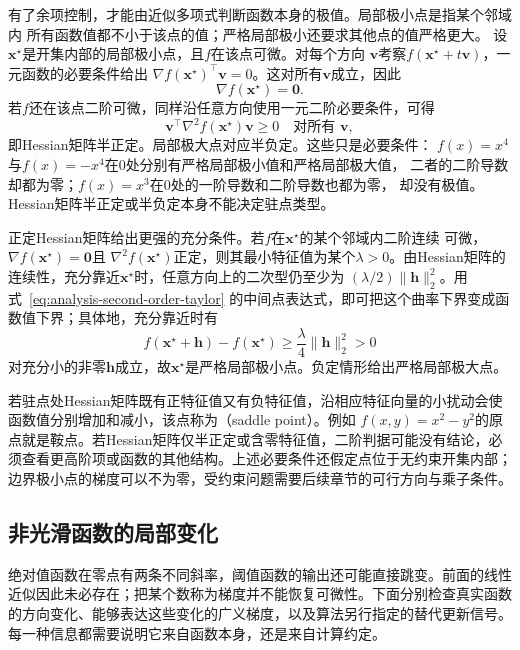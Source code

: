 有了余项控制，才能由近似多项式判断函数本身的极值。局部极小点是指某个邻域内
所有函数值都不小于该点的值；严格局部极小还要求其他点的值严格更大。
设$\bm{x}^{\star}$是开集内部的局部极小点，且$f$在该点可微。对每个方向 $\bm{v}$考察$f(\bm{x}^{\star}+t\bm{v})$，一元函数的必要条件给出 $\nabla f(\bm{x}^{\star})^{\top}\bm{v}=0$。这对所有$\bm{v}$成立，因此
\begin{equation}
  \nabla f(\bm{x}^{\star})=\bm{0}.
\label{eq:analysis-first-order-necessary}
\end{equation}
若$f$还在该点二阶可微，同样沿任意方向使用一元二阶必要条件，可得
\begin{equation}
  \bm{v}^{\top}\nabla^2f(\bm{x}^{\star})\bm{v}\geq0
  \quad\text{对所有 }\bm{v},
\label{eq:analysis-second-order-necessary}
\end{equation}
即Hessian矩阵半正定。局部极大点对应半负定。这些只是必要条件：
$f(x)=x^4$与$f(x)=-x^4$在$0$处分别有严格局部极小值和严格局部极大值，
二者的二阶导数却都为零；$f(x)=x^3$在$0$处的一阶导数和二阶导数也都为零，
却没有极值。Hessian矩阵半正定或半负定本身不能决定驻点类型。

正定Hessian矩阵给出更强的充分条件。若$f$在$\bm{x}^{\star}$的某个邻域内二阶连续
可微，$\nabla f(\bm{x}^{\star})=\bm{0}$且
$\nabla^2f(\bm{x}^{\star})$正定，则其最小特征值为某个$\lambda>0$。由Hessian矩阵的
连续性，充分靠近$\bm{x}^{\star}$时，任意方向上的二次型仍至少为
$(\lambda/2)\lVert\bm{h}\rVert_2^2$。用式~\eqref{eq:analysis-second-order-taylor}
的中间点表达式，即可把这个曲率下界变成函数值下界；具体地，充分靠近时有
\[   f(\bm{x}^{\star}+\bm{h})-f(\bm{x}^{\star})   \geq   \frac{\lambda}{4}\lVert\bm{h}\rVert_2^2>0 \]
对充分小的非零$\bm{h}$成立，故$\bm{x}^{\star}$是严格局部极小点。负定情形给出严格局部极大点。

若驻点处Hessian矩阵既有正特征值又有负特征值，沿相应特征向量的小扰动会使函数值分别增加和减小，该点称为（saddle point）。例如 $f(x,y)=x^2-y^2$的原点就是鞍点。若Hessian矩阵仅半正定或含零特征值，二阶判据可能没有结论，必须查看更高阶项或函数的其他结构。上述必要条件还假定点位于无约束开集内部； 边界极小点的梯度可以不为零，受约束问题需要后续章节的可行方向与乘子条件。

\subsection{非光滑函数的局部变化}
\label{sec:analysis-nonsmooth-surrogate-gradient}
绝对值函数在零点有两条不同斜率，阈值函数的输出还可能直接跳变。前面的线性近似因此未必存在；把某个数称为梯度并不能恢复可微性。下面分别检查真实函数的方向变化、能够表达这些变化的广义梯度，以及算法另行指定的替代更新信号。每一种信息都需要说明它来自函数本身，还是来自计算约定。

